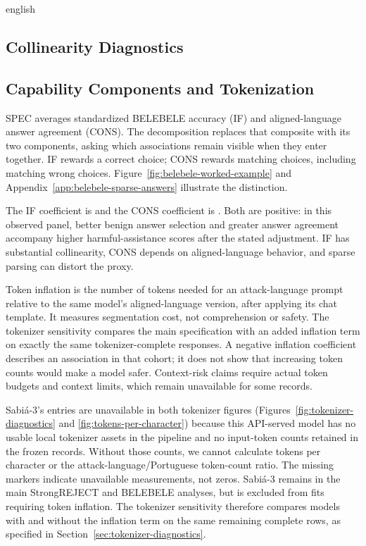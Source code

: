 \begin{otherlanguage*}{english}
\clearpage
\subsection{Collinearity Diagnostics}



\clearpage
\GradedDiagnosticsTable
\GradedSingleTable



\subsection{Capability Components and Tokenization}

SPEC averages standardized BELEBELE accuracy (IF) and aligned-language answer agreement (CONS). The decomposition replaces that composite with its two components, asking which associations remain visible when they enter together. IF rewards a correct choice; CONS rewards matching choices, including matching wrong choices. Figure~\ref{fig:belebele-worked-example} and Appendix~\ref{app:belebele-sparse-answers} illustrate the distinction.

\GradedComponentsTable

The IF coefficient is \GIfCoef{} and the CONS coefficient is \GConsCoef{}. Both are positive: in this observed panel, better benign answer selection and greater answer agreement accompany higher harmful-assistance scores after the stated adjustment. IF has substantial collinearity, CONS depends on aligned-language behavior, and sparse parsing can distort the proxy.

\afterpage{\TokenizerDiagnosticsFigure\TokensPerCharacterFigure}

Token inflation is the number of tokens needed for an attack-language prompt relative to the same model's aligned-language version, after applying its chat template. It measures segmentation cost, not comprehension or safety. The tokenizer sensitivity compares the main specification with an added inflation term on exactly the same tokenizer-complete responses. A negative inflation coefficient describes an association in that cohort; it does not show that increasing token counts would make a model safer. Context-risk claims require actual token budgets and context limits, which remain unavailable for some records.

Sabi\'a-3's entries are unavailable in both tokenizer figures (Figures~\ref{fig:tokenizer-diagnostics} and \ref{fig:tokens-per-character}) because this API-served model has no usable local tokenizer assets in the pipeline and no input-token counts retained in the frozen records. Without those counts, we cannot calculate tokens per character or the attack-language/Portuguese token-count ratio. The missing markers indicate unavailable measurements, not zeros. Sabi\'a-3 remains in the main StrongREJECT and BELEBELE analyses, but is excluded from fits requiring token inflation. The tokenizer sensitivity therefore compares models with and without the inflation term on the same remaining complete rows, as specified in Section~\ref{sec:tokenizer-diagnostics}.



\end{otherlanguage*}
